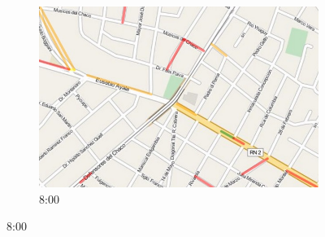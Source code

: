 \begin{figure}[!htbp]
\begin{subfigure}[b]{0.30\textwidth}
		\includegraphics[width=\textwidth]{capitulos/7/figuras/8.jpg}
		\caption{8:00}
	\end{subfigure}
	

\end{figure}
